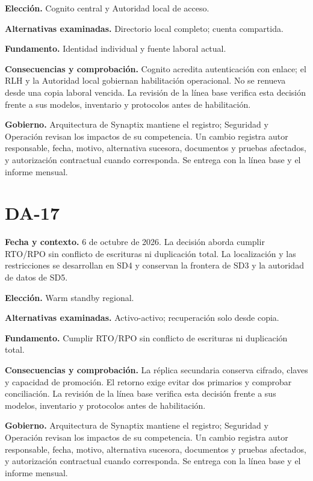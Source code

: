 \documentclass[11pt,letterpaper]{report}
\begin{document}
\textbf{Elección.} Cognito central y Autoridad local de acceso.

\textbf{Alternativas examinadas.} Directorio local completo; cuenta compartida.

\textbf{Fundamento.} Identidad individual y fuente laboral actual.

\textbf{Consecuencias y comprobación.} Cognito acredita autenticación con enlace; el RLH y la Autoridad local gobiernan habilitación operacional. No se renueva desde una copia laboral vencida. La revisión de la línea base verifica esta decisión frente a sus modelos, inventario y protocolos antes de habilitación.

\textbf{Gobierno.} Arquitectura de Synaptix mantiene el registro; Seguridad y Operación revisan los impactos de su competencia. Un cambio registra autor responsable, fecha, motivo, alternativa sucesora, documentos y pruebas afectados, y autorización contractual cuando corresponda. Se entrega con la línea base y el informe mensual.

\section*{DA-17}

\textbf{Fecha y contexto.} 6 de octubre de 2026. La decisión aborda cumplir RTO/RPO sin conflicto de escrituras ni duplicación total. La localización y las restricciones se desarrollan en SD4 y conservan la frontera de SD3 y la autoridad de datos de SD5.

\textbf{Elección.} Warm standby regional.

\textbf{Alternativas examinadas.} Activo-activo; recuperación solo desde copia.

\textbf{Fundamento.} Cumplir RTO/RPO sin conflicto de escrituras ni duplicación total.

\textbf{Consecuencias y comprobación.} La réplica secundaria conserva cifrado, claves y capacidad de promoción. El retorno exige evitar dos primarios y comprobar conciliación. La revisión de la línea base verifica esta decisión frente a sus modelos, inventario y protocolos antes de habilitación.

\textbf{Gobierno.} Arquitectura de Synaptix mantiene el registro; Seguridad y Operación revisan los impactos de su competencia. Un cambio registra autor responsable, fecha, motivo, alternativa sucesora, documentos y pruebas afectados, y autorización contractual cuando corresponda. Se entrega con la línea base y el informe mensual.
\end{document}
